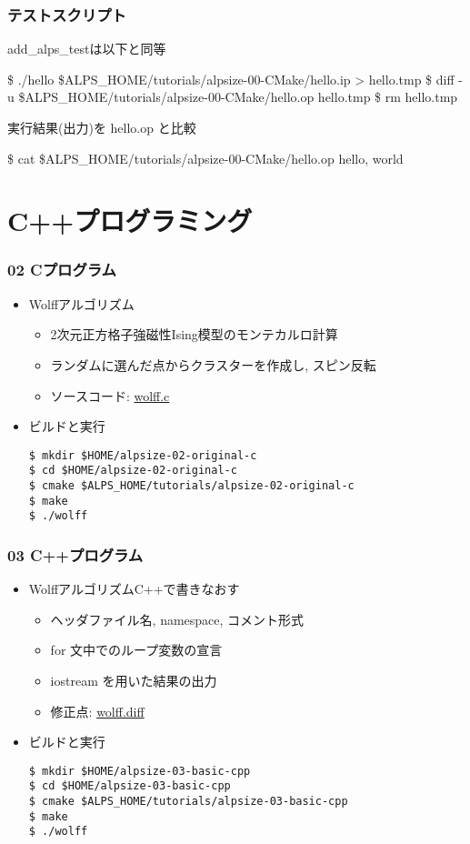 \begin{frame}[fragile]
  \frametitle{テストスクリプト}
add\_alps\_testは以下と同等
\begin{semiverbatim}
\$ ./hello \$ALPS_HOME/tutorials/alpsize-00-CMake/hello.ip > hello.tmp
\$ diff -u \$ALPS_HOME/tutorials/alpsize-00-CMake/hello.op hello.tmp
\$ rm hello.tmp
\end{semiverbatim}
実行結果(出力)を hello.op と比較
\begin{semiverbatim}
\$ cat \$ALPS_HOME/tutorials/alpsize-00-CMake/hello.op
hello, world
\end{semiverbatim}
\end{frame}

\section{C++プログラミング}
\begin{frame}[fragile]
  \frametitle{02 Cプログラム}
  \begin{itemize}
    \item Wolffアルゴリズム
      \begin{itemize}
        \item 2次元正方格子強磁性Ising模型のモンテカルロ計算
        \item ランダムに選んだ点からクラスターを作成し, スピン反転
        \item ソースコード: \href{https://github.com/cmsi/alps-tutorial/blob/develop/alpsize/02-wolff.c}{wolff.c}
      \end{itemize}
    \item ビルドと実行
\begin{lstlisting}
$ mkdir $HOME/alpsize-02-original-c
$ cd $HOME/alpsize-02-original-c
$ cmake $ALPS_HOME/tutorials/alpsize-02-original-c
$ make
$ ./wolff
\end{lstlisting}
\end{itemize}
\end{frame}

\begin{frame}[fragile]
  \frametitle{03 C++プログラム}
  \begin{itemize}
    \item WolffアルゴリズムC++で書きなおす
      \begin{itemize}
        \item ヘッダファイル名, namespace, コメント形式
        \item for 文中でのループ変数の宣言
        \item iostream を用いた結果の出力
        \item 修正点: \href{https://github.com/cmsi/alps-tutorial/blob/develop/alpsize/03-wolff.diff}{wolff.diff}
      \end{itemize}
    \item ビルドと実行
\begin{lstlisting}
$ mkdir $HOME/alpsize-03-basic-cpp
$ cd $HOME/alpsize-03-basic-cpp
$ cmake $ALPS_HOME/tutorials/alpsize-03-basic-cpp
$ make
$ ./wolff
\end{lstlisting}
  \end{itemize}
\end{frame}

